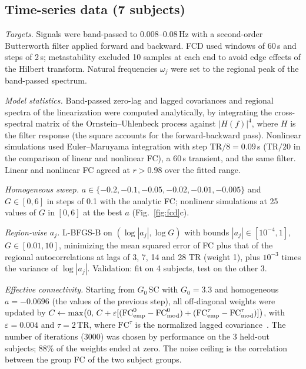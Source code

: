 \documentclass[aip,cha,reprint,amsmath,amssymb]{revtex4-2}
\theoremstyle{remark}
\begin{document}
\subsection{Time-series data (7 subjects)}

\emph{Targets.} Signals were band-passed to 0.008--0.08\,Hz with a second-order Butterworth filter applied forward and backward. FCD used windows of 60\,s and steps of 2\,s; metastability excluded 10 samples at each end to avoid edge effects of the Hilbert transform. Natural frequencies $\omega_j$ were set to the regional peak of the band-passed spectrum.

\emph{Model statistics.} Band-passed zero-lag and lagged covariances and regional spectra of the linearization were computed analytically, by integrating the cross-spectral matrix of the Ornstein--Uhlenbeck process against $|H(f)|^4$, where $H$ is the filter response (the square accounts for the forward-backward pass). Nonlinear simulations used Euler--Maruyama integration with step $\mathrm{TR}/8=0.09$\,s ($\mathrm{TR}/20$ in the comparison of linear and nonlinear FC), a 60\,s transient, and the same filter. Linear and nonlinear FC agreed at $r>0.98$ over the fitted range.

\emph{Homogeneous sweep.} $a\in\{-0.2,-0.1,-0.05,-0.02,-0.01,-0.005\}$ and $G\in[0,6]$ in steps of 0.1 with the analytic FC; nonlinear simulations at 25 values of $G$ in $[0,6]$ at the best $a$ (Fig.~\ref{fig:fcd}c).

\emph{Region-wise $a_j$.} L-BFGS-B on $(\log|a_j|,\log G)$ with bounds $|a_j|\in[10^{-4},1]$, $G\in[0.01,10]$, minimizing the mean squared error of FC plus that of the regional autocorrelations at lags of 3, 7, 14 and 28 TR (weight 1), plus $10^{-3}$ times the variance of $\log|a_j|$. Validation: fit on 4 subjects, test on the other 3.

\emph{Effective connectivity.} Starting from $G_0\,\mathrm{SC}$ with $G_0=3.3$ and homogeneous $a=-0.0696$ (the values of the previous step), all off-diagonal weights were updated by
$C\leftarrow\max\bigl(0,\,C+\varepsilon[(\mathrm{FC}^{0}_{\rm emp}-\mathrm{FC}^{0}_{\rm mod})+(\mathrm{FC}^{\tau}_{\rm emp}-\mathrm{FC}^{\tau}_{\rm mod})]\bigr)$,
with $\varepsilon=0.004$ and $\tau=2$\,TR, where $\mathrm{FC}^\tau$ is the normalized lagged covariance~\cite{Gilson2016}. The number of iterations (3000) was chosen by performance on the 3 held-out subjects; 88\% of the weights ended at zero. The noise ceiling is the correlation between the group FC of the two subject groups.
\end{document}
